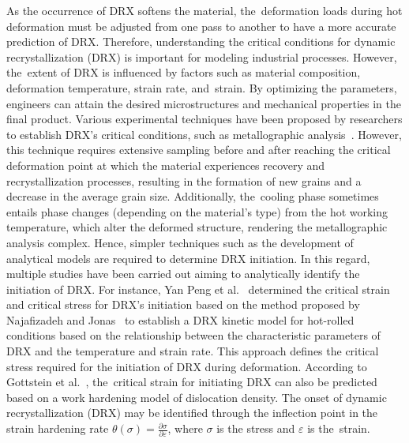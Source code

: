 \documentclass[metals,article,accept,pdftex,moreauthors]{Definitions/mdpi}
\makeatletter
\DeclareRobustCommand{\eal}{et al.\@\xspace}
\makeatother
\begin{document}
As the occurrence of DRX softens the material, the~deformation loads during hot deformation must be adjusted from one pass to another to have a more accurate prediction of DRX.
Therefore, understanding the critical conditions for dynamic recrystallization (DRX) is important for modeling industrial processes.
However, the~extent of DRX is influenced by factors such as material composition, deformation temperature, strain rate, and~strain.
By optimizing the parameters, engineers can attain the desired microstructures and mechanical properties in the final product.
Various experimental techniques have been proposed by researchers to establish DRX's critical conditions, such as metallographic analysis~\cite{Babu-2022}.
However, this technique requires extensive sampling before and after reaching the critical deformation point at which the material experiences recovery and recrystallization processes, resulting in the formation of new grains and a decrease in the average grain size.
Additionally, the~cooling phase sometimes entails phase changes (depending on the material's type) from the hot working temperature, which alter the deformed structure, rendering the metallographic analysis complex.
Hence, simpler techniques such as the development of analytical models are required to determine DRX initiation.
In this regard, multiple studies have been carried out aiming to analytically identify the initiation of DRX.
For instance, Yan Peng \eal~\cite{Peng-2022} determined the critical strain and critical stress for DRX's initiation based on the method proposed by Najafizadeh and Jonas~\cite{Najafizadeh-2006} to establish a DRX kinetic model for hot-rolled conditions based on the relationship between the characteristic parameters of DRX and the temperature and strain rate. This approach defines the critical stress required for the initiation of DRX during deformation.
According to Gottstein \eal~\cite{Gottstein-2004}, the~critical strain for initiating DRX can also be predicted based on a work hardening model of dislocation density.
The onset of dynamic recrystallization (DRX) may be identified through the inflection point in the strain hardening rate $\theta(\sigma)=\frac{\partial \sigma}{\partial \varepsilon}$, where $\sigma$ is the stress and $\varepsilon$ is the~strain.
\end{document}
